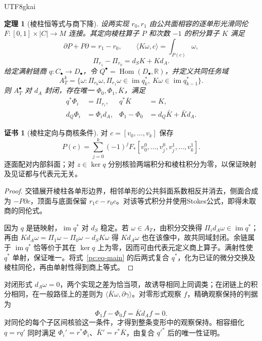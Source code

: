 \documentclass[11pt,a4paper]{article}
\theoremstyle{plain}
\newtheorem{theorem}{定理}[section]
\theoremstyle{definition}
\newtheorem*{certificate}{证书}
\theoremstyle{remark}
\begin{document}
\begin{CJK*}{UTF8}{gkai}
\begin{theorem}[棱柱恒等式与商下降]
\label{pc:homotopy-descent}
设两实现 $r_0,r_1$ 由公共面相容的逐单形光滑同伦 $F:[0,1]\times|C|\to M$ 连接。其定向棱柱算子 $P$ 和次数 $-1$ 的积分算子 $K$ 满足
\[
 \partial P+P\partial=r_1-r_0,\qquad
 \langle K\omega,c\rangle=\int_{P(c)}\omega,
\]
\[
 \Pi_{r_1}-\Pi_{r_0}=d_SK+Kd_A.
\]
给定满射链商 $q:C_\bullet\to D_\bullet$，令 $Q^\bullet=\operatorname{Hom}(D_\bullet,\mathbb R)$，并定义共同任务域
\[
 A_T^k=\{\omega:\Pi_{r_0}\omega,\Pi_{r_1}\omega\in\operatorname{im}q_k^*,
                         \ K\omega\in\operatorname{im}q_{k-1}^*\}.
\]
则 $A_T^\bullet$ 对 $d_A$ 封闭，存在唯一 $\Phi_0,\Phi_1,\bar K$，满足
\begin{equation}
\label{pc:eq-main}
\begin{aligned}
 q^*\Phi_i&=\Pi_{r_i},& q^*\bar K&=K,\\
 d_Q\Phi_i&=\Phi_i d_A,&
 \Phi_1-\Phi_0&=d_Q\bar K+\bar Kd_A.
\end{aligned}
\end{equation}
\end{theorem}
\begin{certificate}[棱柱定向与商核条件]
对 $c=[v_0,\ldots,v_k]$ 保存
\[
 P(c)=\sum_{j=0}^k(-1)^j
 F_*[v_0^0,\ldots,v_j^0,v_j^1,\ldots,v_k^1].
\]
逐面配对内部斜面；对 $z\in\ker q$ 分别核验两端积分和棱柱积分为零，以保证映射及见证都与代表元无关。
\end{certificate}
\begin{proof}
交错展开棱柱各单形边界，相邻单形的公共斜面系数相反并消去，侧面合成为 $-P\partial c$，顶面与底面保留 $r_1c-r_0c$。对该等式积分并使用Stokes公式，即得未取商的同伦式。

因为 $q$ 是链映射，$\operatorname{im}q^*$ 对 $d_S$ 稳定。若 $\omega\in A_T$，由积分交换得 $\Pi_i d_A\omega\in\operatorname{im}q^*$；再由
$Kd_A\omega=\Pi_1\omega-\Pi_0\omega-d_SK\omega$ 得 $Kd_A\omega$ 也在该像中，故共同域封闭。余链属于 $\operatorname{im}q^*$ 恰等价于其在 $\ker q$ 上为零，因而可由代表元定义商上算子。满射性使 $q^*$ 单射，保证唯一。将式~\eqref{pc:eq-main} 的后两式复合 $q^*$，化为已证的微分交换及棱柱同伦，再由单射性得到商上等式。
\end{proof}

对闭形式 $d_A\omega=0$，两个实现之差为恰当项，故诱导相同上同调类；在闭链上的积分相同，在一般路径上的差则为 $\langle\bar K\omega,\partial\gamma\rangle$。对零形式观察 $f$，精确观察保持的判据为
\[
 \Phi_1f-\Phi_0f=\bar Kd_Af=0.
\]
对同伦的每个子区间核验这一条件，才得到整条变形中的观察保持。相容细化 $q=rq'$ 同时满足 $\Phi_i'=r^*\Phi_i$、$\bar K'=r^*\bar K$，由复合 $q'^*$ 后的唯一性证明。


\end{CJK*}
\end{document}
